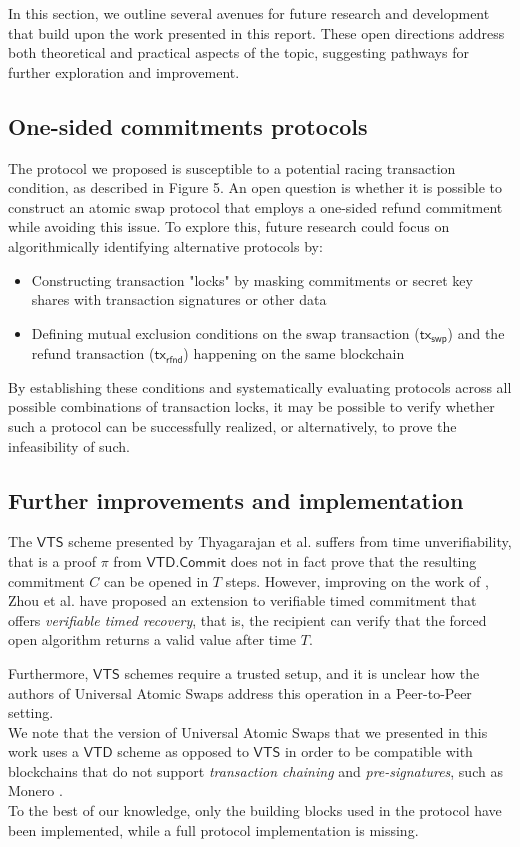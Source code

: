 \documentclass{article}      	%
\begin{document}
In this section, we outline several avenues for future research and development that build upon the work presented in this report. These open directions address both theoretical and practical aspects of the topic, suggesting pathways for further exploration and improvement.
\subsection*{One-sided commitments protocols}
The protocol we proposed is susceptible to a potential racing transaction condition, as described in Figure 5. An open question is whether it is possible to construct an atomic swap protocol that employs a one-sided refund commitment while avoiding this issue. 
To explore this, future research could focus on algorithmically identifying alternative protocols by:
\begin{itemize}
        \item Constructing transaction "locks" by masking commitments or secret key shares with transaction signatures or other data
        \item Defining mutual exclusion conditions on the swap transaction ($\mathsf{tx_{swp}}$) and the refund transaction ($\mathsf{tx_{rfnd}}$) happening on the same blockchain
\end{itemize}
By establishing these conditions and systematically evaluating protocols across all possible combinations of transaction locks, it may be possible to verify whether such a protocol can be successfully realized, or alternatively, to prove the infeasibility of such.

\subsection*{Further improvements and implementation}
The $\mathsf{VTS}$ scheme presented  by Thyagarajan et al. \cite{vts} suffers from time unverifiability, that is a proof $\pi$ from $\mathsf{VTD}.\mathsf{Commit}$ does not in fact prove that the resulting commitment $C$ can be opened in $T$ steps. However, improving on the work of \cite{vts}, Zhou et al. \cite{fixed_vts} have proposed an extension to verifiable timed commitment that offers \textit{verifiable timed recovery}, that is, the recipient can verify that the forced open algorithm returns a valid value after time $T$.

Furthermore, $\mathsf{VTS}$ schemes require a trusted setup, and it is unclear how the authors of Universal Atomic Swaps \cite{uas} address this operation in a Peer-to-Peer setting. \\
We note that the version of Universal Atomic Swaps that we presented in this work uses a $\mathsf{VTD}$ scheme as opposed to $\mathsf{VTS}$ in order to be compatible with blockchains that do not support \textit{transaction chaining} and \textit{pre-signatures}, such as Monero \cite{pre_sign}. \\
To the best of our knowledge, only the building blocks used in the protocol have been implemented, while a full protocol implementation is missing.
\end{document}
